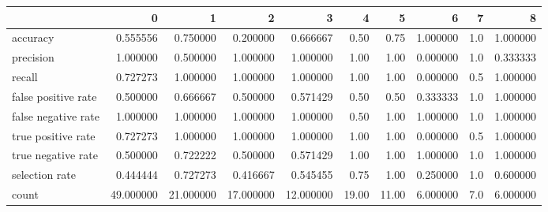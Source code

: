 \begin{tabular}{lrrrrrrrrr}
\toprule
{} &          0 &          1 &          2 &          3 &      4 &      5 &         6 &    7 &         8 \\
\midrule
accuracy            &   0.555556 &   0.750000 &   0.200000 &   0.666667 &   0.50 &   0.75 &  1.000000 &  1.0 &  1.000000 \\
precision           &   1.000000 &   0.500000 &   1.000000 &   1.000000 &   1.00 &   1.00 &  0.000000 &  1.0 &  0.333333 \\
recall              &   0.727273 &   1.000000 &   1.000000 &   1.000000 &   1.00 &   1.00 &  0.000000 &  0.5 &  1.000000 \\
false positive rate &   0.500000 &   0.666667 &   0.500000 &   0.571429 &   0.50 &   0.50 &  0.333333 &  1.0 &  1.000000 \\
false negative rate &   1.000000 &   1.000000 &   1.000000 &   1.000000 &   0.50 &   1.00 &  1.000000 &  1.0 &  1.000000 \\
true positive rate  &   0.727273 &   1.000000 &   1.000000 &   1.000000 &   1.00 &   1.00 &  0.000000 &  0.5 &  1.000000 \\
true negative rate  &   0.500000 &   0.722222 &   0.500000 &   0.571429 &   1.00 &   1.00 &  1.000000 &  1.0 &  1.000000 \\
selection rate      &   0.444444 &   0.727273 &   0.416667 &   0.545455 &   0.75 &   1.00 &  0.250000 &  1.0 &  0.600000 \\
count               &  49.000000 &  21.000000 &  17.000000 &  12.000000 &  19.00 &  11.00 &  6.000000 &  7.0 &  6.000000 \\
\bottomrule
\end{tabular}
